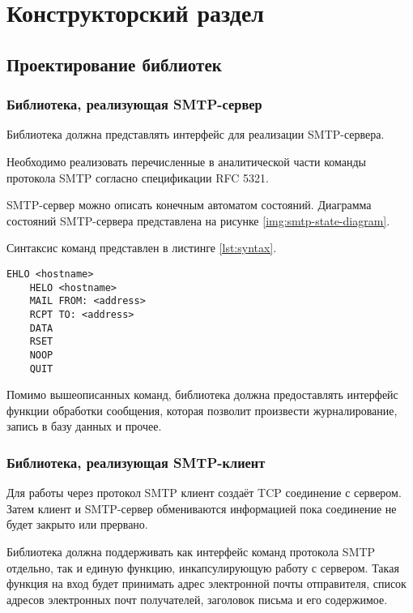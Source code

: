 \chapter{Конструкторский раздел}

\section{Проектирование библиотек}

\subsection{Библиотека, реализующая SMTP-сервер}

Библиотека должна представлять интерфейс для реализации SMTP-сервера.

Необходимо реализовать перечисленные в аналитической части команды протокола SMTP согласно спецификации RFC 5321.

SMTP-сервер можно описать конечным автоматом состояний.
Диаграмма состояний SMTP-сервера представлена на рисунке \ref{img:smtp-state-diagram}.


Синтаксис команд представлен в листинге \ref{lst:syntax}.

\begin{lstlisting}[gobble=8, caption={Синтаксис поддерживаемых команд\label{lst:syntax}}]
	EHLO <hostname>
	HELO <hostname>
	MAIL FROM: <address>
	RCPT TO: <address>
	DATA
	RSET
	NOOP
	QUIT
\end{lstlisting}

Помимо вышеописанных команд, библиотека должна предоставлять интерфейс функции обработки сообщения, которая позволит произвести журналирование, запись в базу данных и прочее.

\subsection{Библиотека, реализующая SMTP-клиент}

Для работы через протокол SMTP клиент создаёт TCP соединение с сервером.
Затем клиент и SMTP-сервер обмениваются информацией пока соединение не будет закрыто или прервано.

Библиотека должна поддерживать как интерфейс команд протокола SMTP отдельно, так и единую функцию, инкапсулирующую работу с сервером.
Такая функция на вход будет принимать адрес электронной почты отправителя, список адресов электронных почт получателей, заголовок письма и его содержимое.

